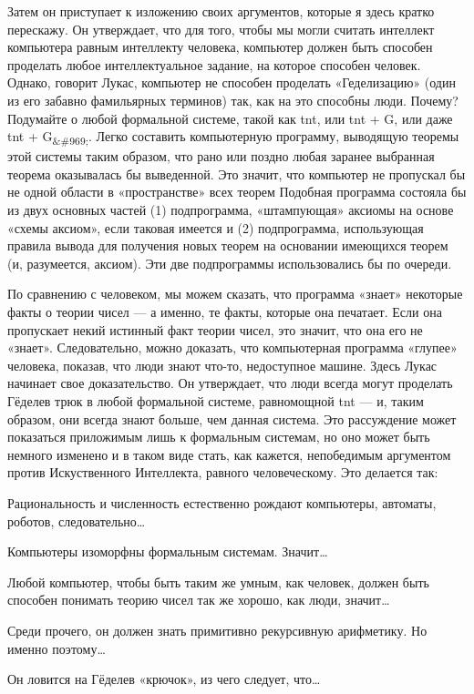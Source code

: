 \documentclass[../main.tex]{subfiles}
\begin{document}
Затем он приступает к изложению своих аргументов, которые я здесь кратко перескажу. Он утверждает, что для того, чтобы мы могли считать интеллект компьютера равным интеллекту человека, компьютер должен быть способен проделать любое интеллектуальное задание, на которое способен человек. Однако, говорит Лукас, компьютер не способен проделать «Геделизацию» (один из его забавно фамильярных терминов) так, как на это способны люди. Почему? Подумайте о любой формальной системе, такой как \acs{tnt}, или \acs{tnt} + G, или даже \acs{tnt} + G\textsubscript{\&\#969;}. Легко составить компьютерную программу, выводящую теоремы этой системы таким образом, что рано или поздно любая заранее выбранная теорема оказывалась бы выведенной. Это значит, что компьютер не пропускал бы не одной области в «пространстве» всех теорем Подобная программа состояла бы из двух основных частей (1) подпрограмма, «штампующая» аксиомы на основе «схемы аксиом», если таковая имеется и (2) подпрограмма, использующая правила вывода для получения новых теорем на основании имеющихся теорем (и, разумеется, аксиом). Эти две подпрограммы использовались бы по очереди.

По сравнению с человеком, мы можем сказать, что программа «знает» некоторые факты о теории чисел --- а именно, те факты, которые она печатает. Если она пропускает некий истинный факт теории чисел, это значит, что она его не «знает». Следовательно, можно доказать, что компьютерная программа «глупее» человека, показав, что люди знают что-то, недоступное машине. Здесь Лукас начинает свое доказательство. Он утверждает, что люди всегда могут проделать Гёделев трюк в любой формальной системе, равномощной \acs{tnt} --- и, таким образом, они всегда знают больше, чем данная система. Это рассуждение может показаться приложимым лишь к формальным системам, но оно может быть немного изменено и в таком виде стать, как кажется, непобедимым аргументом против Искуственного Интеллекта, равного человеческому. Это делается так:

Рациональность и численность естественно рождают компьютеры, автоматы, роботов, следовательно\ldots{}

Компьютеры изоморфны формальным системам. Значит\ldots{}

Любой компьютер, чтобы быть таким же умным, как человек, должен быть способен понимать теорию чисел так же хорошо, как люди, значит\ldots{}

Среди прочего, он должен знать примитивно рекурсивную арифметику. Но именно поэтому\ldots{}

Он ловится на Гёделев «крючок», из чего следует, что\ldots{}
\end{document}
